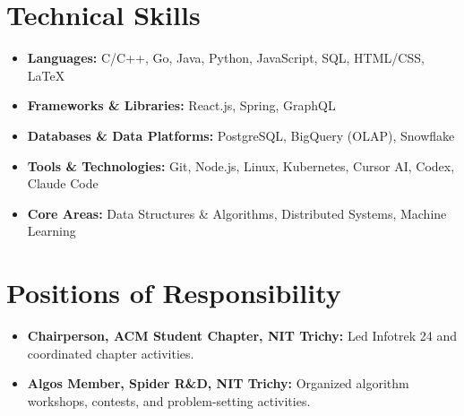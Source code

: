 \documentclass[10pt,a4paper]{article}
\begin{document}
\section*{Technical Skills}
\begin{itemize}[leftmargin=*, noitemsep]
    \item \textbf{Languages:} C/C++, Go, Java, Python, JavaScript, SQL, HTML/CSS, LaTeX
    \item \textbf{Frameworks \& Libraries:} React.js, Spring, GraphQL
    \item \textbf{Databases \& Data Platforms:} PostgreSQL, BigQuery (OLAP), Snowflake
    \item \textbf{Tools \& Technologies:} Git, Node.js, Linux, Kubernetes, Cursor AI, Codex, Claude Code
    \item \textbf{Core Areas:} Data Structures \& Algorithms, Distributed Systems, Machine Learning
\end{itemize}

\section*{Positions of Responsibility}
\begin{itemize}[leftmargin=*, noitemsep]
    \item \textbf{Chairperson, ACM Student Chapter, NIT Trichy:} Led Infotrek 24 and coordinated chapter activities.
    \item \textbf{Algos Member, Spider R\&D, NIT Trichy:} Organized algorithm workshops, contests, and problem-setting activities.
\end{itemize}
\end{document}
